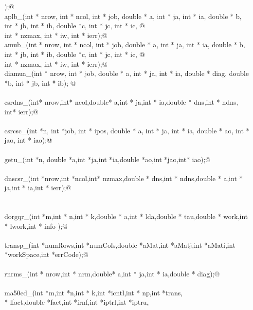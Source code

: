 \documentclass[12pt]{article}
\begin{document}
\begin{flushleft}
\begin{minipage}{\linewidth}
\begin{list}{}{}
\mbox{}\verb@                );@\\
\mbox{}\verb@int aplb_(int * nrow, int * ncol, int * job, double * a, int * ja, int * ia, double * b, int * jb, int * ib, double *c, int * jc, int * ic, @\\
\mbox{}\verb@        int * nzmax, int * iw, int * ierr);@\\
\mbox{}\verb@int amub_(int * nrow, int * ncol, int * job, double * a, int * ja, int * ia, double * b, int * jb, int * ib, double *c, int * jc, int * ic, @\\
\mbox{}\verb@        int * nzmax, int * iw, int * ierr);@\\
\mbox{}\verb@int diamua_(int * nrow,  int * job, double * a, int * ja, int * ia, double * diag, double *b, int * jb, int * ib); @\\
\mbox{}\verb@@\\
\mbox{}\verb@int csrdns_(int* nrow,int* ncol,double* a,int * ja,int * ia,double * dns,int * ndns, int* ierr);@\\
\mbox{}\verb@@\\
\mbox{}\verb@int csrcsc_(int *n, int *job, int * ipos, double * a, int * ja, int * ia, double * ao, int * jao, int * iao);@\\
\mbox{}\verb@@\\
\mbox{}\verb@int getu_(int *n, double *a,int *ja,int *ia,double *ao,int *jao,int* iao);@\\
\mbox{}\verb@@\\
\mbox{}\verb@int dnscsr_(int *nrow,int *ncol,int* nzmax,double * dns,int * ndns,double * a,int * ja,int * ia,int * ierr);@\\
\mbox{}\verb@@\\
\mbox{}\verb@@\\
\mbox{}\verb@void dorgqr_(int *m,int * n,int * k,double * a,int * lda,double * tau,double * work,int * lwork,int * info );@\\
\mbox{}\verb@@\\
\mbox{}\verb@void transp_(int *numRows,int *numCols,double *aMat,int *aMatj,int *aMati,int *workSpace,int *errCode);@\\
\mbox{}\verb@@\\
\mbox{}\verb@int rnrms_(int * nrow,int * nrm,double* a,int * ja,int * ia,double * diag);@\\
\mbox{}\verb@@\\
\mbox{}\verb@void ma50cd_(int *m,int *n,int * k,int *icntl,int * np,int *trans,\@\\
\mbox{}\verb@int * lfact,double *fact,int *irnf,int *iptrl,int *iptru,\@\\

\end{list}
\end{minipage}
\end{flushleft}
\end{document}
